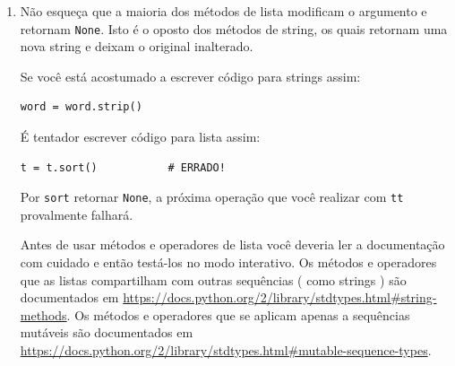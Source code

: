 
\begin{enumerate}

\item Não esqueça que a maioria dos métodos de lista modificam o argumento
  e retornam {\tt None}. Isto é o oposto dos métodos de string, os quais retornam
  uma nova string e deixam o original inalterado.

Se você está acostumado a escrever código para strings assim:




\beforeverb
\begin{verbatim}
word = word.strip()
\end{verbatim}
\afterverb

É tentador escrever código para lista assim:

\beforeverb
\begin{verbatim}
t = t.sort()           # ERRADO!
\end{verbatim}
\afterverb


Por {\tt sort} retornar {\tt None}, a
próxima operação que você realizar com {\tt tt} provalmente falhará.

Antes de usar métodos e operadores de lista você deveria ler a documentação com
cuidado e então testá-los no modo interativo. Os métodos e operadores que as listas
compartilham com outras sequências ( como strings ) são documentados em
\url{https://docs.python.org/2/library/stdtypes.html#string-methods}.
Os métodos e operadores que se aplicam apenas a sequências mutáveis são documentados
em
\url{https://docs.python.org/2/library/stdtypes.html#mutable-sequence-types}.





\end{enumerate}
